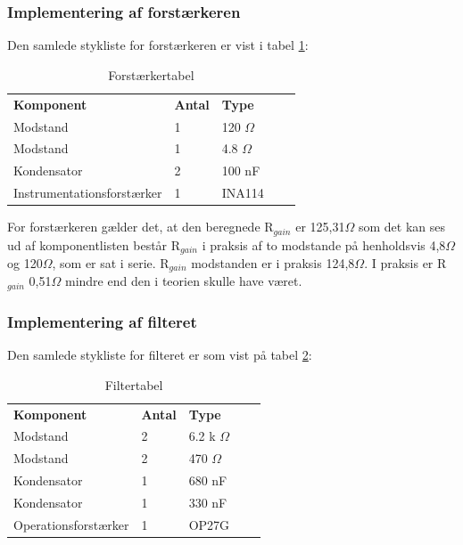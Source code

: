 \subsubsection{Implementering af forstærkeren}
Den samlede stykliste for forstærkeren er vist i tabel \ref{DForsttabel}:

\begin{table}[H]
\centering
\begin{tabular}{|l|l|l|ll}
\cline{1-3}
\textbf{Komponent} & \textbf{Antal} & \textbf{Type}  &  &  \\ \cline{1-3}
Modstand           & 1              & 120 $\Omega$   &  &  \\ \cline{1-3}
Modstand           & 1              & 4.8 $\Omega$   &  &  \\ \cline{1-3}
Kondensator        & 2              & 100 nF         &  &  \\ \cline{1-3}
Instrumentationsforstærker &    1   & INA114		     &  &  \\ \cline{1-3}
\end{tabular}
\caption{Forstærkertabel}
\label{DForsttabel}
\end{table}

For forstærkeren gælder det, at den beregnede R$_{gain}$ er 125,31$\Omega$ som det kan ses ud af komponentlisten består R$_{gain}$ i praksis af to modstande på henholdsvis 4,8$\Omega$ og 120$\Omega$, som er sat i serie. R$_{gain}$ modstanden er i praksis 124,8$\Omega$. I praksis er R$_{gain}$ 0,51$\Omega$ mindre end den i teorien skulle have været.

\subsubsection{Implementering af filteret}
Den samlede stykliste for filteret er som vist på tabel \ref{DFiltertabel}:

\begin{table}[H]
\centering
\begin{tabular}{|l|l|l|ll}
\cline{1-3}
\textbf{Komponent} & \textbf{Antal} & \textbf{Type}  &  &  \\ \cline{1-3}
Modstand           & 2              & 6.2 k $\Omega$ &  &  \\ \cline{1-3}
Modstand           & 2              & 470 $\Omega$   &  &  \\ \cline{1-3}
Kondensator        & 1              & 680 nF         &  &  \\ \cline{1-3}
Kondensator        & 1              & 330 nF         &  &  \\ \cline{1-3}
Operationsforstærker &    1         & OP27G          &  &  \\ \cline{1-3}
\end{tabular}
\caption{Filtertabel}
\label{DFiltertabel}
\end{table}

